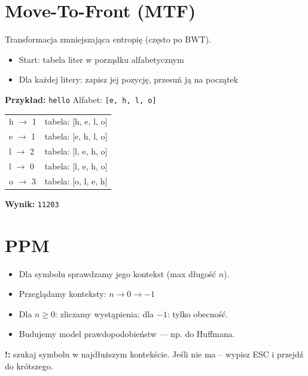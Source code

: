 \documentclass{../konspekt}
\begin{document}
\begin{multicols}{2}
  \section*{Move-To-Front (MTF)}

  Transformacja zmniejszająca entropię (często po BWT).

  \begin{itemize}
    \item Start: tabela liter w porządku alfabetycznym
    \item Dla każdej litery: zapisz jej pozycję, przesuń ją na początek
  \end{itemize}

  \textbf{Przykład:} \texttt{hello}
  Alfabet: \texttt{[e, h, l, o]}
  \begin{tabular}{ll}
    h $\rightarrow$ 1 & tabela: [h, e, l, o] \\
    e $\rightarrow$ 1 & tabela: [e, h, l, o] \\
    l $\rightarrow$ 2 & tabela: [l, e, h, o] \\
    l $\rightarrow$ 0 & tabela: [l, e, h, o] \\
    o $\rightarrow$ 3 & tabela: [o, l, e, h]
  \end{tabular}

  \textbf{Wynik:} \texttt{11203}
  \section*{PPM}

  \begin{itemize}
    \item Dla symbolu sprawdzamy jego kontekst (max długość $n$).
    \item Przeglądamy konteksty: $n \to 0 \to -1$
    \item Dla $n \geq 0$: zliczamy wystąpienia; dla $-1$: tylko obecność.
    \item Budujemy model prawdopodobieństw — np. do Huffmana.
  \end{itemize}
  \textbf{!:} szukaj symbolu w najdłuższym kontekście. Jeśli nie ma –
  wypisz ESC i przejdź do krótszego.
  \vspace{-1.5em}


\end{multicols}
\end{document}
